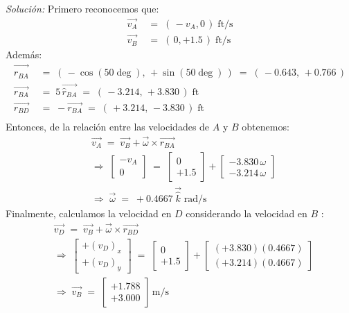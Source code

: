 \documentclass[ a4paper, twoside, 11pt]{article}
\begin{document}
\begin{problem}
\emph{Soluci\'on:} Primero reconocemos que: 
\begin{align*}
\vec{v_A} \; & = \; ( \, -v_A, 0 \, ) \; \text{ft/s} \\
\vec{v_B} \; & = \; ( \, 0, +1.5 \, ) \; \text{ft/s}
\end{align*}
Adem\'as: 
\begin{align*}
\vec{\hat{r}_{BA}} \; & = \;
( \, -\cos(50\deg), \, +\sin(50\deg) \, ) \; = \;
( \, -0.643, \, +0.766 \, ) \\
\vec{r_{BA}} \; & = \; 5 \, \vec{\hat{r}_{BA}} \; = \;
( \, -3.214, \, +3.830 \, ) \; \text{ft} \\
\vec{r_{BD}} \; & = \; -\vec{r_{BA}} \; = \; 
( \, +3.214, \, -3.830 \, ) \; \text{ft} \\
\end{align*}
Entonces, de la relaci\'on entre las velocidades de $A$ y $B$ obtenemos: 
\begin{align*}
& \vec{v_A} \; = \; \vec{v_B} + \vec{\omega} \times \vec{r_{BA}} \\[1ex]
& \Longrightarrow \; \left[ \begin{array}{c}
-v_A \\ 0
\end{array} \right] \; = \;
\left[ \begin{array}{c}
0 \\ +1.5
\end{array} \right] + 
\left[ \begin{array}{c}
-3.830 \, \omega \\ -3.214 \, \omega
\end{array} \right] \\[1ex]
& \Longrightarrow \; \vec{\omega} \; = \; +0.4667 \, \vec{\hat{k}} \; \text{rad/s}
\end{align*}
Finalmente, calculamos la velocidad en $D$ considerando la velocidad en $B$ :
\begin{align*}
& \vec{v_D} \; = \; \vec{v_B} + \vec{\omega} \times \vec{r_{BD}} \\[1ex]
& \Longrightarrow \; \left[ \begin{array}{c}
+(v_D)_x \\ +(v_D)_y
\end{array} \right] \; = \;
\left[ \begin{array}{c}
0 \\ +1.5
\end{array} \right] + 
\left[ \begin{array}{c}
(+3.830)(0.4667) \\ (+3.214)(0.4667)
\end{array} \right] \\[1ex]
& \Longrightarrow \; \vec{v_B} \; = \; 
\left[ \begin{array}{c}
+1.788 \\ +3.000
\end{array} \right] \, \text{m/s}
\end{align*}

\end{problem}
\fullskip
\end{document}
